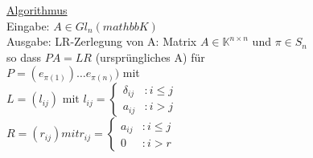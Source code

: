 \underline{Algorithmus} \\
Eingabe: $A \in Gl_n (mathbb{K})$ \\
Ausgabe: LR-Zerlegung von A:  Matrix $ A \in \mathbb{K}^{n \times n}$ und 
$\pi \in S_n$ \\
so dass $PA = LR$ (ursprüngliches A) für \\
$P = (e_{\pi(1)}) \dots e_{\pi(n)})$ mit \\
$L = (l_{ij}) \text{ mit } l_{ij} = 
\begin{cases} \delta_{ij} &: i \le j \\  a_{ij} &: i > j  \end{cases} $ \\
$R = (r_{ij}) mit r_{ij} = 
\begin{cases} a_{ij} &: i \le j \\ 0 &: i > r  \end{cases}$
